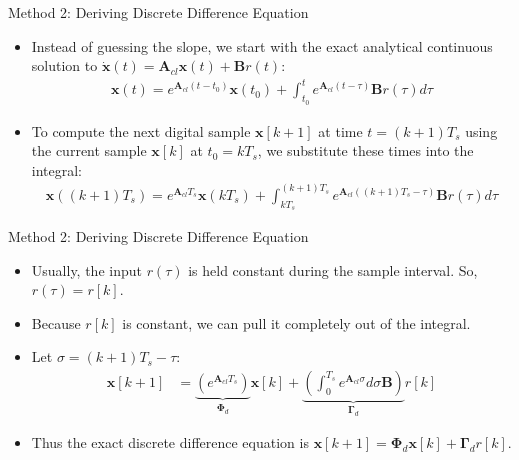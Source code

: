 \documentclass{beamer}
\theoremstyle{remark}
\let\vec\mathbf
\numberwithin{equation}{section}
\begin{document}
\begin{frame}{Method 2: Deriving Discrete Difference Equation}
    \begin{itemize}
        \item Instead of guessing the slope, we start with the exact analytical continuous solution to $\dot{\vec{x}}(t) = \vec{A}_{cl}\vec{x}(t) + \vec{B}r(t)$:
        \begin{align}
            \vec{x}(t) = e^{\vec{A}_{cl}(t-t_0)}\vec{x}(t_0) + \int_{t_0}^{t} e^{\vec{A}_{cl}(t-\tau)}\vec{B}r(\tau) d\tau
        \end{align}
        \item To compute the next digital sample $\vec{x}[k+1]$ at time $t = (k+1)T_s$ using the current sample $\vec{x}[k]$ at $t_0 = kT_s$, we substitute these times into the integral:
        \begin{align}
            \vec{x}((k+1)T_s) = e^{\vec{A}_{cl}T_s}\vec{x}(kT_s) + \int_{kT_s}^{(k+1)T_s} e^{\vec{A}_{cl}((k+1)T_s-\tau)}\vec{B}r(\tau) d\tau
        \end{align}
    \end{itemize}
\end{frame}

\begin{frame}{Method 2: Deriving Discrete Difference Equation}
    \begin{itemize}
        \item Usually, the input $r(\tau)$ is held constant during the sample interval. So, $r(\tau) = r[k]$.
        \item Because $r[k]$ is constant, we can pull it completely out of the integral. 
        \item Let $\sigma = (k+1)T_s - \tau$:
        \begin{align}
            \vec{x}[k+1] &= \underbrace{\left(e^{\vec{A}_{cl}T_s}\right)}_{\vec{\Phi}_d} \vec{x}[k] + \underbrace{\left(\int_0^{T_s} e^{\vec{A}_{cl}\sigma} d\sigma \vec{B}\right)}_{\vec{\Gamma}_d} r[k]
        \end{align}
        \item Thus the exact discrete difference equation is $\vec{x}[k+1] = \vec{\Phi}_d \vec{x}[k] + \vec{\Gamma}_d r[k]$.
    \end{itemize}
\end{frame}
\end{document}
